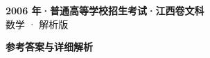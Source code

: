 \documentclass[zihao=-4, a4paper]{ctexart}
\begin{document}
\begin{center}
  {\Large\bfseries 2006 年·普通高等学校招生考试·江西卷文科}\\[4pt]
  {\large 数学 · 解析版}
\end{center}
\medskip
{}

\clearpage
{}
\begin{center}{\Large\bfseries 参考答案与详细解析}\end{center}
\medskip

\end{document}

